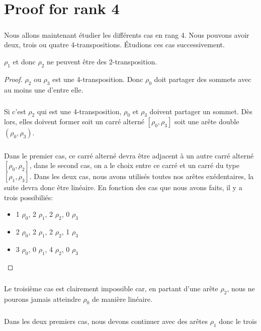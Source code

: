 \chapter{Proof for rank 4}

\paragraph{}
Nous allons maintenant étudier les différents cas en rang 4. Nous pouvons avoir deux, trois ou quatre 4-transpositions. Étudions ces cas successivement.

\begin{theorem}
  $\rho_1$ et donc $\rho_2$ ne peuvent être des 2-transposition.
\end{theorem}

\begin{proof}
  $\rho_2$ ou $\rho_3$ est une 4-transposition. Donc $\rho_0$ doit partager des sommets avec au moins une d'entre elle.

  \paragraph{}
  Si c'est $\rho_2$ qui est une 4-transposition, $\rho_0$ et $\rho_3$ doivent partager un sommet. Dès lors, elles doivent former soit un carré alterné $[\rho_0, \rho_3]$ soit une arête double $(\rho_0, \rho_3)$.

  \paragraph{}
  Dans le premier cas, ce carré alterné devra être adjacent à un autre carré alterné $[\rho_0, \rho_2]$, dans le second cas, on a le choix entre ce carré et un carré du type $[\rho_1, \rho_3]$. Dans les deux cas, nous avons utilisés toutes nos arêtes exédentaires, la suite devra donc être linéaire. En fonction des cas que nous avons faits, il y a trois possibiliés:

  \begin{itemize}
    \item 1 $\rho_0$, 2 $\rho_1$, 2 $\rho_2$, 0 $\rho_3$
    \item 2 $\rho_0$, 2 $\rho_1$, 2 $\rho_2$, 1 $\rho_3$
    \item 3 $\rho_0$, 0 $\rho_1$, 4 $\rho_2$, 0 $\rho_3$
  \end{itemize}
\end{proof}

\paragraph{}
Le troisième cas est clairement impossible car, en partant d'une arête $\rho_2$, nous ne pourons jamais atteindre $\rho_0$ de manière linéaire.

\paragraph{}
Dans les deux premiers cas, nous devons continuer avec des arêtes $\rho_1$ donc le trois
